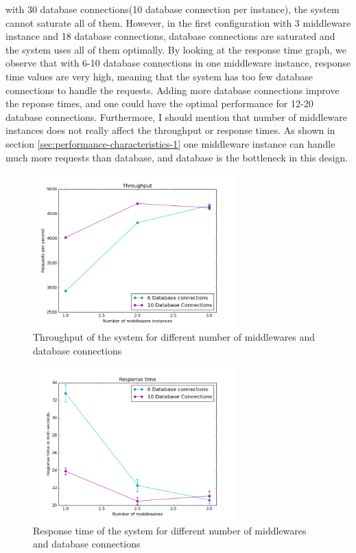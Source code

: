 \documentclass[11pt]{article}
\begin{document}
with 30 database connections(10 database connection per instance),
the system cannot saturate all of them. However, in the first configuration
with 3 middleware instance and 18 database connections, database
connections are saturated and the system uses all of them optimally.
By looking at the response time graph, we observe that with 6-10
database connections in one middleware instance, response time values 
are very high, meaning that the system has too few database connections 
to handle the requests. Adding more database connections improve the 
reponse times, and one could have the optimal performance for 
12-20 database connections. Furthermore, I should mention that 
number of middleware instances does not really affect the throughput 
or response times. As shown in section \ref{sec:performance-characteristics-1}
one middleware instance can handle much more requests than database, and database 
is the bottleneck in this design.

\begin{figure}[ht]
  \includegraphics[width=0.7\textwidth,page=1]{figures/scalability_throughput}
  \centering
  \caption{Throughput of the system for different number of middlewares and database
  connections}
  \label{fig:scalability_throughput}
\end{figure}

\begin{figure}[ht]
  \includegraphics[width=0.7\textwidth,page=1]{figures/scalability_response_time}
  \centering
  \caption{Response time of the system for different number of middlewares and 
  database connections}
  \label{fig:scalability_response_time}
\end{figure}
\end{document}
